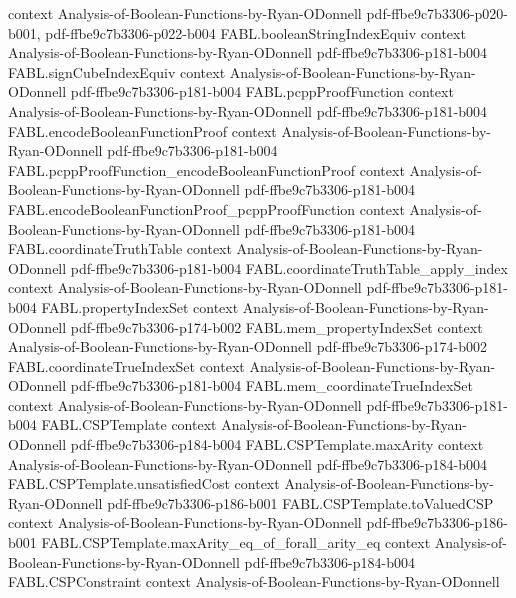 \begin{theorem}
  {context}
  {Analysis-of-Boolean-Functions-by-Ryan-ODonnell}
  {pdf-ffbe9c7b3306-p020-b001,
    pdf-ffbe9c7b3306-p022-b004}
\proofstep
  {FABL.booleanStringIndexEquiv}
  {context}
  {Analysis-of-Boolean-Functions-by-Ryan-ODonnell}
  {pdf-ffbe9c7b3306-p181-b004}
\proofstep
  {FABL.signCubeIndexEquiv}
  {context}
  {Analysis-of-Boolean-Functions-by-Ryan-ODonnell}
  {pdf-ffbe9c7b3306-p181-b004}
\proofstep
  {FABL.pcppProofFunction}
  {context}
  {Analysis-of-Boolean-Functions-by-Ryan-ODonnell}
  {pdf-ffbe9c7b3306-p181-b004}
\proofstep
  {FABL.encodeBooleanFunctionProof}
  {context}
  {Analysis-of-Boolean-Functions-by-Ryan-ODonnell}
  {pdf-ffbe9c7b3306-p181-b004}
\proofstep
  {FABL.pcppProofFunction_encodeBooleanFunctionProof}
  {context}
  {Analysis-of-Boolean-Functions-by-Ryan-ODonnell}
  {pdf-ffbe9c7b3306-p181-b004}
\proofstep
  {FABL.encodeBooleanFunctionProof_pcppProofFunction}
  {context}
  {Analysis-of-Boolean-Functions-by-Ryan-ODonnell}
  {pdf-ffbe9c7b3306-p181-b004}
\proofstep
  {FABL.coordinateTruthTable}
  {context}
  {Analysis-of-Boolean-Functions-by-Ryan-ODonnell}
  {pdf-ffbe9c7b3306-p181-b004}
\proofstep
  {FABL.coordinateTruthTable_apply_index}
  {context}
  {Analysis-of-Boolean-Functions-by-Ryan-ODonnell}
  {pdf-ffbe9c7b3306-p181-b004}
\proofstep
  {FABL.propertyIndexSet}
  {context}
  {Analysis-of-Boolean-Functions-by-Ryan-ODonnell}
  {pdf-ffbe9c7b3306-p174-b002}
\proofstep
  {FABL.mem_propertyIndexSet}
  {context}
  {Analysis-of-Boolean-Functions-by-Ryan-ODonnell}
  {pdf-ffbe9c7b3306-p174-b002}
\proofstep
  {FABL.coordinateTrueIndexSet}
  {context}
  {Analysis-of-Boolean-Functions-by-Ryan-ODonnell}
  {pdf-ffbe9c7b3306-p181-b004}
\proofstep
  {FABL.mem_coordinateTrueIndexSet}
  {context}
  {Analysis-of-Boolean-Functions-by-Ryan-ODonnell}
  {pdf-ffbe9c7b3306-p181-b004}
\proofstep
  {FABL.CSPTemplate}
  {context}
  {Analysis-of-Boolean-Functions-by-Ryan-ODonnell}
  {pdf-ffbe9c7b3306-p184-b004}
\proofstep
  {FABL.CSPTemplate.maxArity}
  {context}
  {Analysis-of-Boolean-Functions-by-Ryan-ODonnell}
  {pdf-ffbe9c7b3306-p184-b004}
\proofstep
  {FABL.CSPTemplate.unsatisfiedCost}
  {context}
  {Analysis-of-Boolean-Functions-by-Ryan-ODonnell}
  {pdf-ffbe9c7b3306-p186-b001}
\proofstep
  {FABL.CSPTemplate.toValuedCSP}
  {context}
  {Analysis-of-Boolean-Functions-by-Ryan-ODonnell}
  {pdf-ffbe9c7b3306-p186-b001}
\proofstep
  {FABL.CSPTemplate.maxArity_eq_of_forall_arity_eq}
  {context}
  {Analysis-of-Boolean-Functions-by-Ryan-ODonnell}
  {pdf-ffbe9c7b3306-p184-b004}
\proofstep
  {FABL.CSPConstraint}
  {context}
  {Analysis-of-Boolean-Functions-by-Ryan-ODonnell}

\end{theorem}
